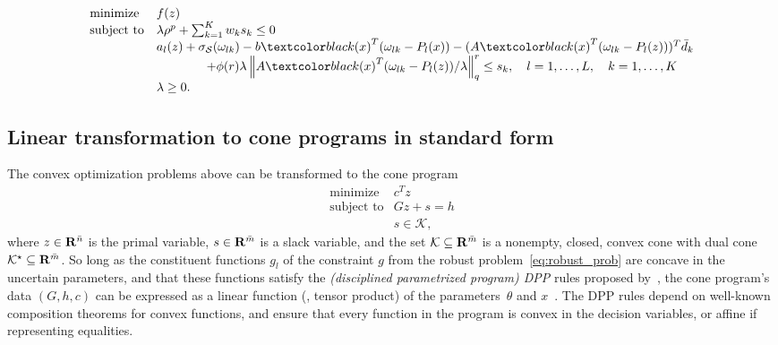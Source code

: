 \begin{equation}
	\label{c4:eq:mro_max}
	\begin{aligned}
		\begin{array}{ll}
			\text{minimize } & f(z)\\
			\mbox{subject to} & \lambda\rho^p  + \sum_{k=1}^{K} w_{k} s_{k}  \le 0\\
			& a_l(z) + \sigma_\supp(\omega_{lk}) - b\RC{(x)}^T(\omega_{lk} - P_l(x)) - (A\RC{(x)}^T(\omega_{lk} - P_l(z)))^T\bar{d}_k \\
   &\qquad \qquad + \phi(r)\lambda \left\|A\RC{(x)}^T(\omega_{lk} - P_l(z))/\lambda \right\|^r_q \leq s_k, \quad l = 1,\dots, L, \quad k = 1,\dots, K\\
			& \lambda \geq 0.
		\end{array}
	\end{aligned}
\end{equation}

\subsection{Linear transformation to cone programs in standard form}
\label{sec:dpp}
The convex optimization problems above can be transformed to the cone program~\citep{cvxpylayers2019}
	\begin{equation}
 \label{eq:conic}
		\begin{array}{ll}
			\mbox{minimize} & c^Tz\\
			\mbox{subject to} & Gz+ s = h \\
			& s \in \mathcal{K},
		\end{array}
	\end{equation}
where $z \in {\mathbf R}^{\bar{n}}$ is the primal variable, $s \in {\mathbf R}^{\bar{m}}$ is a slack variable, and the set $\mathcal{K} \subseteq {\mathbf R}^{\bar{m}}$ is a nonempty, closed, convex cone with dual cone $\mathcal{K}^\star \subseteq {\mathbf R}^{\bar{m}}$.  So long as  the constituent functions $g_l$ of the constraint $g$ from the robust problem~\eqref{eq:robust_prob}
are concave in the uncertain parameters, and that these functions satisfy the {\it (disciplined parametrized program) DPP} rules proposed by~\cite{cvxpylayers2019}, the cone program's data $(G,h,c)$ can be expressed as a linear function (\ie, tensor product) of the parameters~$\theta$ and $x$~\citep[Lemma 1]{cvxpylayers2019}. 
The DPP rules depend on well-known composition theorems for convex functions, and ensure that every function in the program is convex in the decision variables, or affine if representing equalities.

